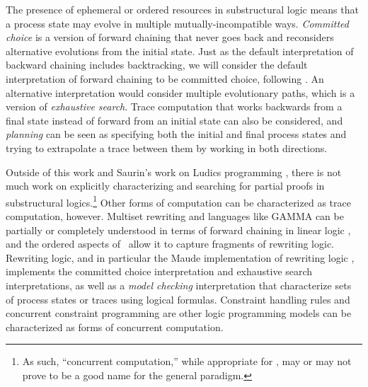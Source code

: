 The presence of ephemeral or ordered resources in substructural logic
means that a process state may evolve in multiple
mutually-incompatible ways. {\it Committed choice} is a version of
forward chaining that never goes back and reconsiders alternative
evolutions from the initial state. Just as the default interpretation
of backward chaining includes backtracking, we will consider the
default interpretation of forward chaining to be committed choice,
following \cite{lopez05monadic}.  An alternative interpretation 
would consider multiple evolutionary paths, which is
a version of {\it exhaustive search}.  Trace computation that works backwards
from a final state instead of forward from an initial state can also
be considered, and {\it planning} can be seen as specifying both the
initial and final process states and trying to extrapolate a trace
between them by working in both directions.

Outside of this work and Saurin's work on Ludics programming
\cite{saurin08towards}, there is not much work on explicitly
characterizing and searching for partial proofs in substructural
logics.\footnote{As such, ``concurrent computation,'' while
  appropriate for \sls, may or may not prove to be a good name for the
  general paradigm.}  Other forms of computation can be characterized
as trace computation, however.  Multiset rewriting and languages like
GAMMA can be partially or completely understood in terms of forward
chaining in linear logic \cite{cervesato09relating,paola96linear}, and
the ordered aspects of \sls~allow it to capture fragments of rewriting
logic. Rewriting logic, and in particular the Maude implementation of
rewriting logic \cite{clavel11ltl}, implements the committed choice
interpretation and exhaustive search interpretations, as well as a
{\it model checking} interpretation that characterize sets of process
states or traces using logical formulas. Constraint handling
rules \cite{betz10complete} and concurrent constraint programming
\cite{jagadeesan05testing} are other logic programming models can be 
characterized as forms of concurrent computation.





